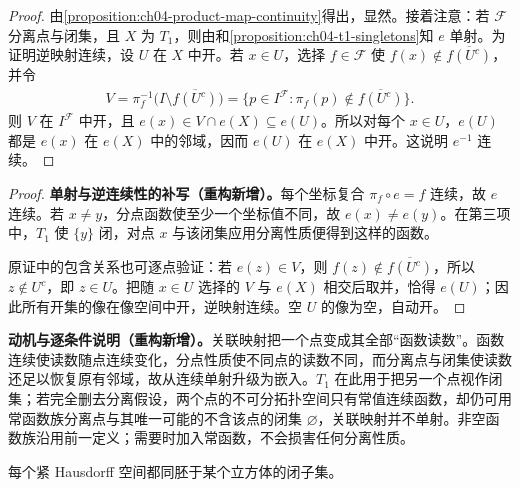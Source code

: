 \documentclass[../../main.tex]{subfiles}
\begin{document}
\begin{proof}
由\cref{proposition:ch04-product-map-continuity}得出，显然。接着注意：若 $\mathcal F$ 分离点与闭集，且 $X$ 为 $T_1$，则由和\cref{proposition:ch04-t1-singletons}知 $e$ 单射。为证明逆映射连续，设 $U$ 在 $X$ 中开。若 $x\in U$，选择 $f\in\mathcal F$ 使 $f(x)\notin\overline{f(U^c)}$，并令
\begin{align*}
V=\pi_f^{-1}\bigl(I\setminus\overline{f(U^c)}\bigr)
=\{p\in I^{\mathcal F}:\pi_f(p)\notin\overline{f(U^c)}\}.
\end{align*}
则 $V$ 在 $I^{\mathcal F}$ 中开，且 $e(x)\in V\cap e(X)\subseteq e(U)$。所以对每个 $x\in U$，$e(U)$ 都是 $e(x)$ 在 $e(X)$ 中的邻域，因而 $e(U)$ 在 $e(X)$ 中开。这说明 $e^{-1}$ 连续。
\end{proof}
\begin{proof}
\textbf{单射与逆连续性的补写（重构新增）。}每个坐标复合 $\pi_f\circ e=f$ 连续，故 $e$ 连续。若 $x\ne y$，分点函数使至少一个坐标值不同，故 $e(x)\ne e(y)$。在第三项中，$T_1$ 使 $\{y\}$ 闭，对点 $x$ 与该闭集应用分离性质便得到这样的函数。

原证中的包含关系也可逐点验证：若 $e(z)\in V$，则 $f(z)\notin\overline{f(U^c)}$，所以 $z\notin U^c$，即 $z\in U$。把随 $x\in U$ 选择的 $V$ 与 $e(X)$ 相交后取并，恰得 $e(U)$；因此所有开集的像在像空间中开，逆映射连续。空 $U$ 的像为空，自动开。
\end{proof}
\begin{remark}
\textbf{动机与逐条件说明（重构新增）。}关联映射把一个点变成其全部“函数读数”。函数连续使读数随点连续变化，分点性质使不同点的读数不同，而分离点与闭集使读数还足以恢复原有邻域，故从连续单射升级为嵌入。$T_1$ 在此用于把另一个点视作闭集；若完全删去分离假设，两个点的不可分拓扑空间只有常值连续函数，却仍可用常函数族分离点与其唯一可能的不含该点的闭集 $\varnothing$，关联映射并不单射。非空函数族沿用前一定义；需要时加入常函数，不会损害任何分离性质。
\end{remark}
\begin{corollary}\label{corollary:ch04-compact-closed-cube}
每个紧 Hausdorff 空间都同胚于某个立方体的闭子集。
\end{corollary}
\end{document}
